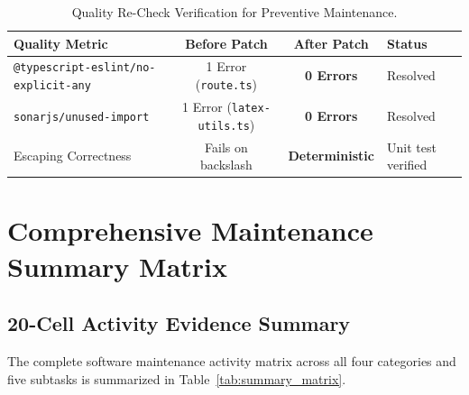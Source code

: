 \documentclass[12pt,a4paper]{article}
\begin{document}
\begin{table}[H]
\centering
\small
\begin{tabularx}{\textwidth}{l c c X}
\toprule
\textbf{Quality Metric} & \textbf{Before Patch} & \textbf{After Patch} & \textbf{Status} \\
\midrule
\texttt{@typescript-eslint/no-explicit-any} & 1 Error (\texttt{route.ts}) & \textbf{0 Errors} & Resolved \\
\texttt{sonarjs/unused-import} & 1 Error (\texttt{latex-utils.ts}) & \textbf{0 Errors} & Resolved \\
Escaping Correctness & Fails on backslash & \textbf{Deterministic} & Unit test verified \\
\bottomrule
\end{tabularx}
\caption{Quality Re-Check Verification for Preventive Maintenance.}
\label{tab:prev_qa}
\end{table}

\newpage

\section{Comprehensive Maintenance Summary Matrix}

\subsection{20-Cell Activity Evidence Summary}
The complete software maintenance activity matrix across all four categories and five subtasks is summarized in Table~\ref{tab:summary_matrix}.
\end{document}
